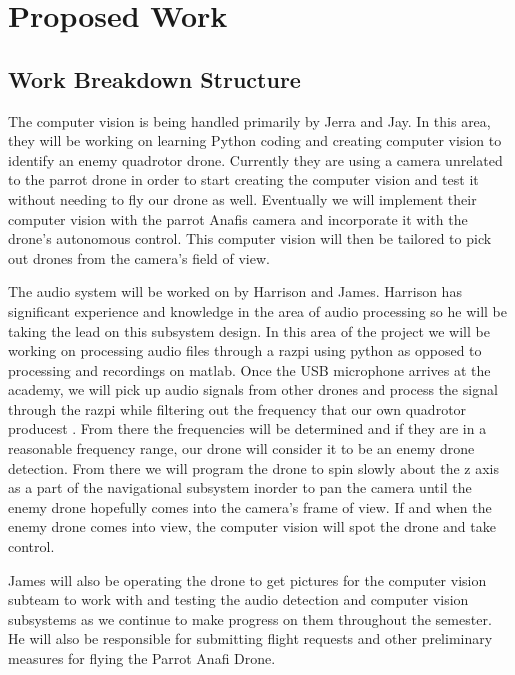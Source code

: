 \documentclass[10pt]{article}
\begin{document}
\section{Proposed Work}
\subsection{Work Breakdown Structure}
The computer vision is being handled primarily by Jerra and Jay.  In this area, they will be working on learning Python coding and creating computer vision to identify an enemy quadrotor drone.  Currently they are using a camera unrelated to the parrot drone in order to start creating the computer vision and test it without needing to fly our drone as well.  Eventually we will implement their computer vision with the parrot Anafis camera and incorporate it with the drone’s autonomous control.  This computer vision will then be tailored to pick out drones from the camera’s field of view.
   
The audio system will be worked on by Harrison and James.  Harrison has significant experience and knowledge in the area of audio processing so he will be taking the lead on this subsystem design.  In this area of the project we will be working on processing audio files through a razpi using python as opposed to processing and recordings on matlab.  Once the USB microphone arrives at the academy, we will pick up audio signals from other drones and process the signal through the razpi while filtering out the frequency that our own quadrotor producest .  From there the frequencies will be determined and if they are in a reasonable frequency range, our drone will consider it to be an enemy drone detection.  From there we will program the drone to spin slowly about the z axis as a part of the navigational subsystem inorder to pan the camera until the enemy drone hopefully comes into the camera's frame of view.  If and when the enemy drone comes into view, the computer vision will spot the drone and take control.  

James will also be operating the drone to get pictures for the computer vision subteam to work with and testing the audio detection and computer vision subsystems as we continue to make progress on them throughout the semester.  He will also be responsible for submitting flight requests and other preliminary measures for flying the Parrot Anafi Drone. 
\end{document}
